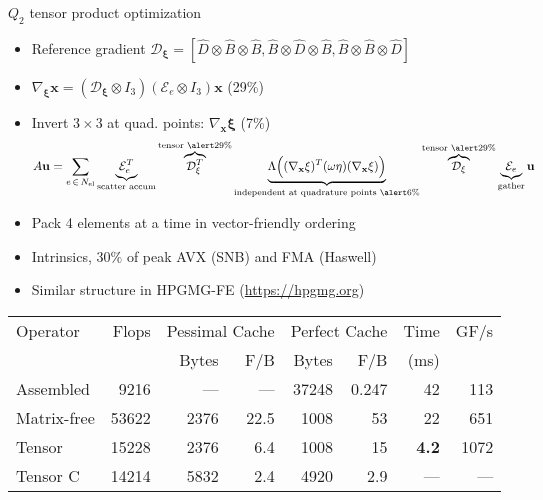 \documentclass{beamer}
\begin{document}
\begin{frame}{$Q_2$ tensor product optimization}
  \begin{itemize}
  \item Reference gradient $\mathcal D_{\mathbf \xi} = [ \hat D \otimes \hat B \otimes \hat B, \hat B \otimes \hat D \otimes \hat B, \hat B \otimes \hat B \otimes \hat D]$
  \item $\nabla_{\mathbf\xi} \mathbf x = (\mathcal D_{\mathbf\xi}\otimes I_3) (\mathcal E_e\otimes I_3) \mathbf x$ \alert{(29\%)}
  \item Invert $3\times 3$ at quad. points: $\nabla_{\mathbf x} \mathbf \xi$ \alert{(7\%)}
    \begin{equation*}
      A \mathbf u = \sum_{e \, \in \, N_\text{el}} 
      \underbrace{\mathcal E_e^T}_{\text{scatter accum}}
      \overbrace{\mathcal D_{\mathbf \xi}^T}^{\text{tensor \alert{29\%}}}
      \underbrace{\Lambda\Big((\nabla_{\mathbf x}\mathbf\xi)^T (\omega \eta) (\nabla_{\mathbf x}\mathbf\xi) \Big)}_{\text{independent at quadrature points \alert{6\%}}}
      \overbrace{\mathcal D_{\mathbf \xi}}^{\text{tensor \alert{29\%}}}
      \underbrace{\mathcal E_e}_{\text{gather}} \mathbf u
    \end{equation*}
  \item Pack 4 elements at a time in vector-friendly ordering
  \item Intrinsics, $30\%$ of peak AVX (SNB) and FMA (Haswell)
  \item Similar structure in HPGMG-FE (\url{https://hpgmg.org})
  \end{itemize}
  \vspace{-1.5em}
  \begin{center}
    \begin{tabular}{lrrrrrrr}
      \toprule
      Operator & Flops & \multicolumn{2}{c}{Pessimal Cache} & \multicolumn{2}{c}{Perfect Cache} & Time & GF/s \\
               & & Bytes & F/B & Bytes & F/B & (ms) & \\
      \midrule
      Assembled & 9216 & --- & --- &  37248 & 0.247 & 42 & 113 \\
      Matrix-free & 53622 & 2376 & 22.5 & 1008 & 53 & 22 & 651 \\
      Tensor & 15228 & 2376 & 6.4 & 1008 & 15 & \textbf {4.2} & 1072 \\
      Tensor C & 14214 & 5832 & 2.4 & 4920 & 2.9 & --- & --- \\
      \bottomrule
    \end{tabular}
  \end{center}
\end{frame}
\end{document}
